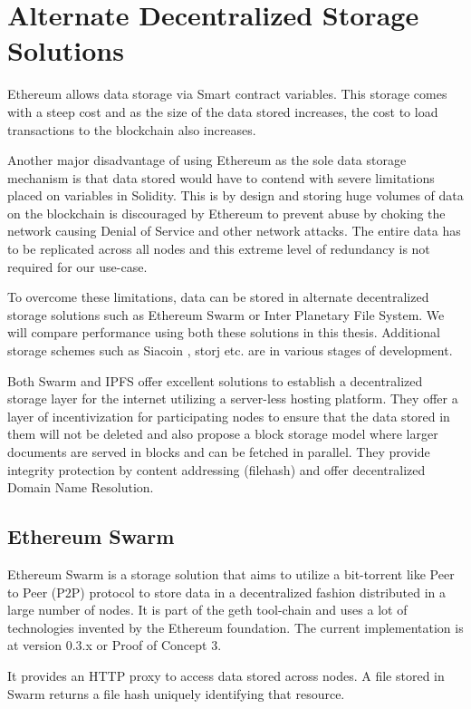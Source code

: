 \documentclass[11pt,openright]{report}
\begin{document}
\section{Alternate Decentralized Storage Solutions}
Ethereum allows data storage via Smart contract variables. This storage comes with a steep cost and as the size of the data stored increases, the cost to load transactions to the blockchain also increases.

Another major disadvantage of using Ethereum as the sole data storage mechanism is that data stored would have to contend with severe limitations placed on variables in Solidity. This is by design and storing huge volumes of data on the blockchain is discouraged by Ethereum to prevent abuse by choking the network causing Denial of Service and other network attacks. The entire data has to be replicated across all nodes and this extreme level of redundancy is not required for our use-case.

To overcome these limitations, data can be stored in alternate decentralized storage solutions such as Ethereum Swarm or Inter Planetary File System. We will compare performance using both these solutions in this thesis. Additional storage schemes such as Siacoin \cite{vorick2014sia}, storj \cite{wilkinsonetal2014storj} etc. are in various stages of development.

Both Swarm and IPFS offer excellent solutions to establish a decentralized storage layer for the internet utilizing a server-less hosting platform. They offer a layer of incentivization for participating nodes to ensure that the data stored in them will not be deleted and also propose a block storage model where larger documents are served in blocks and can be fetched in parallel. They provide integrity protection by content addressing (filehash) and offer decentralized Domain Name Resolution.

\subsection{Ethereum Swarm}
Ethereum Swarm \cite{swarm} is a storage solution that aims to utilize a bit-torrent like Peer to Peer (P2P) protocol to store data in a decentralized fashion distributed in a large number of nodes. It is part of the geth tool-chain and uses a lot of technologies invented by the Ethereum foundation. The current implementation is at version 0.3.x or Proof of Concept 3. 

It provides an HTTP proxy to access data stored across nodes. A file stored in Swarm returns a file hash uniquely identifying that resource.
\end{document}
